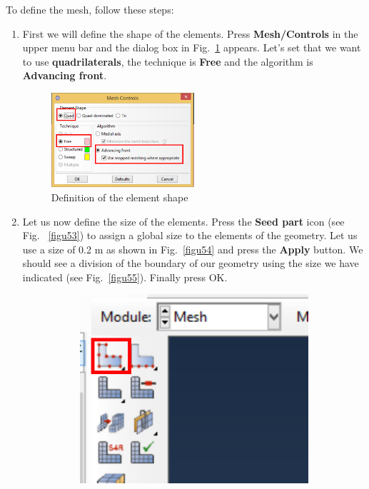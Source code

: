 To define the mesh, follow these steps:
\begin{enumerate}
\item First we will define the shape of the elements. Press
  \textbf{Mesh/Controls} in the upper menu bar and the dialog box in
  Fig.~\ref{figu52} appears. Let's set that we want to use
  \textbf{quadrilaterals},  the technique is \textbf{Free} and
   the algorithm is \textbf{Advancing front}.
  \begin{figure}[!h]
    \centering
    \includegraphics[width=0.50\textwidth]{./body/images/imagen52.pdf}
    \caption{Definition of the element shape}
    \label{figu52}
  \end{figure}
\item Let us now define the size of the elements. Press the
  \textbf{Seed part} icon (see Fig.~ \ref{figu53}) to assign a global
  size to the elements of the geometry. Let us use a size of 0.2 m as
  shown in Fig.~\ref{figu54} and press the \textbf{Apply} button. We
  should see a division of the boundary of our geometry using the size
  we have indicated (see Fig.~\ref{figu55}). Finally press OK.
  \begin{figure}[H]
    \centering
    \begin{subfigure}{0.15\textwidth}
      \includegraphics[width=\textwidth]{./body/images/imagen53.pdf}

\end{subfigure}
\end{figure}
\end{enumerate}
